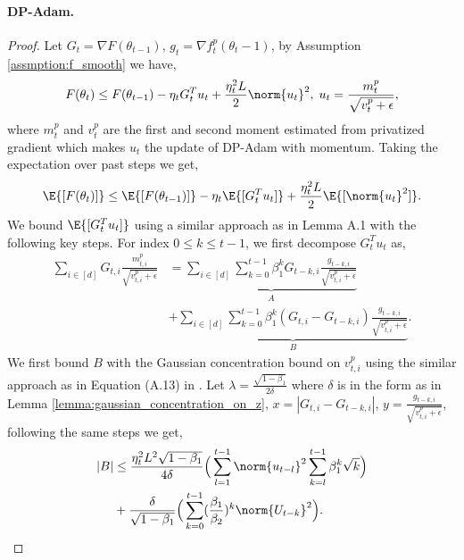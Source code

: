 \documentclass[letterpaper]{article} %
\begin{document}
\paragraph{DP-Adam.}
\begin{proof}
    Let $G_t = \nabla F(\theta_{t-1})$, $g_t = \nabla f_t^{p}(\theta_t-1)$, by Assumption \ref{assmption:f_smooth} we have,
    \[
        F(\theta_t) \leq F(\theta_{t-1}) - \eta_t G_t^T u_t + \frac{\eta_t^2 L}{2} \norm{u_t}^2, \; u_t = \frac{m_t^{p}}{\sqrt{v_t^{p}+\epsilon}},
    \]
    where $m_t^{p}$ and $v_t^{p}$ are the first and second moment estimated from privatized gradient which makes $u_t$ the update of DP-Adam with momentum. Taking the expectation over past steps we get,
    \[
        \E{[F(\theta_t)]} \leq \E{[F(\theta_{t-1})]} - \eta_t \E{[G_t^T u_t]} + \frac{\eta_t^2 L}{2} \E{[\norm{u_t}^2]}.
    \]
    We bound $\E{[G_t^T u_t]}$ using a similar approach as in Lemma A.1 \citep{défossez2022simple} with the following key steps. For index $0 \leq k \leq t-1$, we first decompose $G_t^T u_t$ as,
    \begin{align*}
        \sum_{i\in[d]}G_{t,i}\frac{m_{t,i}^{p}}{\sqrt{v_{t,i}^{p}+\epsilon}} &= \underbrace{\sum_{i\in[d]} \sum_{k=0}^{t-1} \beta_1^{k}G_{t-k, i}\frac{g_{t-k,i}}{\sqrt{v_{t,i}^{p}+\epsilon}}}_{A} \\ &+ \underbrace{\sum_{i\in[d]} \sum_{k=0}^{t-1} \beta_1^{k}(G_{t, i}-G_{t-k, i})\frac{g_{t-k,i}}{\sqrt{v_{t,i}^{p}+\epsilon}}}_{B}.
    \end{align*}
    We first bound $B$ with the Gaussian concentration bound on $v_{t,i}^{p}$ using the similar approach as in Equation (A.13) in \citet{défossez2022simple}. Let $\lambda = \frac{\sqrt{1-\beta_1}}{2\delta}$ where $\delta$ is in the form as in Lemma \ref{lemma:gaussian_concentration_on_z}, $x = |G_{t,i}-G_{t-k, i}|$, $y=\frac{g_{t-k,i}}{\sqrt{v_{t,i}^{p}+\epsilon}}$, following the same steps we get,
    \begin{align*}
        |B| &\leq \frac{\eta_t^2 L^2\sqrt{1-\beta_1}}{4\delta}\Big( \sum_{l=1}^{t-1} \norm{u_{t-l}}^2 \sum_{k=l}^{t-1} \beta_1^k \sqrt{k} \Big)\\ &+ \frac{\delta}{\sqrt{1-\beta_1}}\Big( \sum_{k=0}^{t-1} (\frac{\beta_1}{\beta_2})^k \norm{U_{t-k}}^2 \Big).
    \end{align*}

\end{proof}
\end{document}
